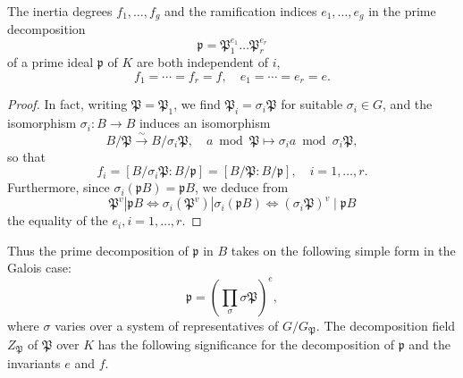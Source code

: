 \documentclass[12pt, oneside]{book}
\begin{document}
\begin{proposition}
    The inertia degrees $f_1, \ldots, f_g$ and the ramification indices $e_1, \ldots, e_g$ in the prime decomposition
    \begin{equation*}
        \mathfrak{p}=\mathfrak{P}_1^{e_1} \ldots \mathfrak{P}_r^{e_r}
    \end{equation*}
    of a prime ideal $\mathfrak{p}$ of $K$ are both independent of $i$,
    \begin{equation*}
        f_1=\cdots=f_r=f, \quad e_1=\cdots=e_r=e .
    \end{equation*}

    \begin{proof}
        In fact, writing $\mathfrak{P}=\mathfrak{P}_1$, we find $\mathfrak{P}_i=\sigma_i \mathfrak{P}$ for suitable $\sigma_i \in G$, and the isomorphism $\sigma_i:B \rightarrow B$ induces an isomorphism
        \begin{equation*}
            B / \mathfrak{P} \xrightarrow{\sim} B / \sigma_i \mathfrak{P}, \quad a \bmod \mathfrak{P} \longmapsto \sigma_i a \bmod \sigma_i \mathfrak{P},
        \end{equation*}
        so that
        \begin{equation*}
            f_i=\left[B / \sigma_i \mathfrak{P}: B / \mathfrak{p}\right]=[B / \mathfrak{P}: B / \mathfrak{p}], \quad i=1, \ldots, r .
        \end{equation*}
        Furthermore, since $\sigma_i(\mathfrak{p} B)=\mathfrak{p} B$, we deduce from
        \begin{equation*}
            \mathfrak{P}^v\left|\mathfrak{p} B \Longleftrightarrow \sigma_i\left(\mathfrak{P}^v\right)\right| \sigma_i(\mathfrak{p} B) \Longleftrightarrow\left(\sigma_i \mathfrak{P}\right)^v \mid \mathfrak{p} B
        \end{equation*}
        the equality of the $e_i, i=1, \ldots, r$.
    \end{proof}
    \begin{remark}
        Thus the prime decomposition of $\mathfrak{p}$ in $B$ takes on the following simple form in the Galois case:
        \begin{equation*}
            \mathfrak{p}=\left(\prod_\sigma \sigma \mathfrak{P}\right)^e,
        \end{equation*}
        where $\sigma$ varies over a system of representatives of $G / G_{\mathfrak{P}}$. The decomposition field $Z_{\mathfrak{P}}$ of $\mathfrak{P}$ over $K$ has the following significance for the decomposition of $\mathfrak{p}$ and the invariants $e$ and $f$.
    \end{remark}
\end{proposition}
\end{document}
